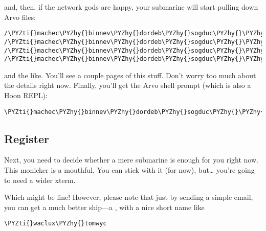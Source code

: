 and, then, if the network gods are happy, your submarine will start pulling
down Arvo files:

\begin{framed_shaded}
\begin{Verbatim}[fontsize=\relsize{-2.5},fontseries=b,commandchars=\\\{\}]
/\PYZti{}machec\PYZhy{}binnev\PYZhy{}dordeb\PYZhy{}sogduc\PYZhy{}\PYZhy{}dosmul\PYZhy{}sarrum\PYZhy{}faplec\PYZhy{}dted/main/1/bin/ticket/hoon
/\PYZti{}machec\PYZhy{}binnev\PYZhy{}dordeb\PYZhy{}sogduc\PYZhy{}\PYZhy{}dosmul\PYZhy{}sarrum\PYZhy{}faplec\PYZhy{}dted/main/1/bin/reset/hoon
/\PYZti{}machec\PYZhy{}binnev\PYZhy{}dordeb\PYZhy{}sogduc\PYZhy{}\PYZhy{}dosmul\PYZhy{}sarrum\PYZhy{}faplec\PYZhy{}nidted/main/1/bin/ye/hoon
/\PYZti{}machec\PYZhy{}binnev\PYZhy{}dordeb\PYZhy{}sogduc\PYZhy{}\PYZhy{}dosmul\PYZhy{}sarrum\PYZhy{}faplec\PYZhy{}nidted/main/1/bin/ls/hoon
\end{Verbatim}
\end{framed_shaded}

and the like.  You'll see a couple pages of this stuff.  Don't worry too much
about the details right now.  Finally, you'll get the Arvo shell prompt (which
is also a Hoon REPL):

\begin{framed_shaded}
\begin{Verbatim}[fontsize=\relsize{-2.5},fontseries=b,commandchars=\\\{\}]
\PYZti{}machec\PYZhy{}binnev\PYZhy{}dordeb\PYZhy{}sogduc\PYZhy{}\PYZhy{}dosmul\PYZhy{}sarrum\PYZhy{}faplec\PYZhy{}nidted/try=\PYZgt{}
\end{Verbatim}
\end{framed_shaded}

\subsection{Register}

Next, you need to decide whether a mere submarine is enough for
you right now.  This monicker is a mouthful.  You can stick with
it (for now), but\ldots{} you're going to need a wider xterm.

Which might be fine!  However, please note that just by sending a
simple email, you can get a much better ship---a ,
with a nice short name like

\begin{framed_shaded}
\begin{Verbatim}[fontsize=\relsize{-2.5},fontseries=b,commandchars=\\\{\}]
\PYZti{}waclux\PYZhy{}tomwyc
\end{Verbatim}
\end{framed_shaded}

